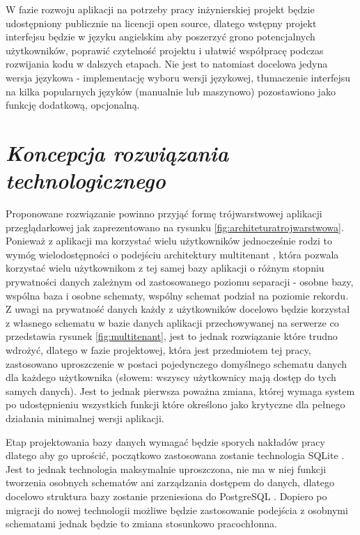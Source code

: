 \documentclass[a4paper,10pt, twoside]{report}
\newcommand{\customstylesection}[1]{\textbf{\textit{#1}}}
\begin{document}
\begin{large}
{W fazie rozwoju aplikacji na potrzeby pracy inżynierskiej projekt będzie 
udostępniony publicznie na licencji open source, dlatego wstępny projekt 
interfejsu będzie w języku angielskim aby poszerzyć grono potencjalnych 
użytkowników, poprawić czytelność projektu i ułatwić współpracę podczas 
rozwijania kodu w dalszych etapach. Nie jest to natomiast docelowa jedyna wersja
 językowa - implementację wyboru wersji językowej, tłumaczenie interfejsu na 
kilka popularnych języków (manualnie lub maszynowo) pozostawiono jako funkcję 
dodatkową, opcjonalną.}


\section{\customstylesection{Koncepcja rozwiązania technologicznego}}
{Proponowane rozwiązanie powinno przyjąć formę trójwarstwowej aplikacji 
przeglądarkowej jak zaprezentowano na rysunku \ref{fig:architeturatrojwarstwowa}.
 Ponieważ z aplikacji ma korzystać wielu użytkowników jednocześnie rodzi to 
wymóg wielodostępności o podejściu architektury multitenant \cite{multitenant}, 
która pozwala korzystać wielu użytkownikom z tej samej bazy aplikacji o różnym 
stopniu prywatności danych zależnym od zastosowanego poziomu separacji - osobne 
bazy, wspólna baza i osobne schematy, wspólny schemat podział na poziomie 
rekordu. Z uwagi na prywatność danych każdy z użytkowników docelowo będzie 
korzystał z własnego schematu w bazie danych aplikacji przechowywanej na 
serwerze co przedstawia rysunek \ref{fig:multitenant}, jest to jednak 
rozwiązanie które trudno wdrożyć, dlatego w fazie projektowej, która jest 
przedmiotem tej pracy, zastosowano uproszczenie w postaci pojedynczego 
domyślnego schematu danych dla każdego użytkownika (słowem: wszyscy użytkownicy 
mają dostęp do tych samych danych). Jest to jednak pierwsza poważna zmiana, 
której wymaga system po udostępnieniu wszystkich funkcji które określono jako 
krytyczne dla pełnego działania minimalnej wersji aplikacji.}

 {Etap projektowania bazy danych wymagać będzie sporych nakładów pracy dlatego 
 aby go uprościć, początkowo zastosowana zostanie technologia SQLite 
 \cite{SQLite}. Jest to jednak technologia maksymalnie uproszczona, nie ma w 
 niej funkcji tworzenia osobnych schematów ani zarządzania dostępem do danych, 
 dlatego docelowo struktura bazy zostanie przeniesiona do PostgreSQL 
 \cite{PostgreSQL}. Dopiero po migracji do nowej technologii możliwe będzie 
 zastosowanie podejścia z osobnymi schematami jednak będzie to zmiana stosunkowo
 pracochłonna.}


\end{large}
\end{document}
